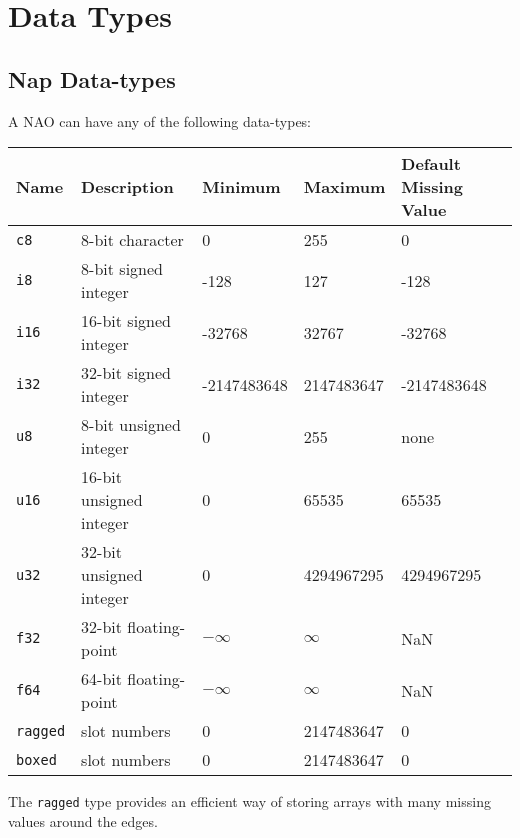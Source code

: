 
\section{Data Types}
    \label{data-type}

\subsection{Nap Data-types}
    \label{data-type-Nap-Data-types}

A NAO can have any of the following data-types:
  
\begin{tabular}{|l|l|l|l|l|}
    \hline 
      \textbf{Name} & \textbf{Description} & \textbf{Minimum} & \textbf{Maximum}
	& \textbf{Default Missing Value}
    \\ \hline 
    \hline 
        \texttt{c8} & 8-bit character & 0 & 255 & 0
    \\ \hline 
        \texttt{i8} & 8-bit signed integer & -128 & 127 & -128
    \\ \hline 
        \texttt{i16} & 16-bit signed integer & -32768 & 32767 & -32768 
    \\ \hline 
        \texttt{i32} & 32-bit signed integer & -2147483648 & 2147483647 & -2147483648 
    \\ \hline 
        \texttt{u8} & 8-bit unsigned integer & 0 & 255 & none
    \\ \hline 
        \texttt{u16} & 16-bit unsigned integer & 0 & 65535 & 65535 
    \\ \hline 
        \texttt{u32} & 32-bit unsigned integer & 0 & 4294967295 & 4294967295 
    \\ \hline 
        \texttt{f32} & 32-bit floating-point & $-\infty$ & $\infty$ & NaN
    \\ \hline 
        \texttt{f64} & 64-bit floating-point & $-\infty$ & $\infty$ & NaN
    \\ \hline 
        \texttt{ragged} & slot numbers & 0 & 2147483647 & 0
    \\ \hline 
        \texttt{boxed} & slot numbers & 0 & 2147483647 & 0
    \\ \hline
\end{tabular}
  

The 
  \texttt{ragged} type provides an efficient way of storing arrays
  with many missing values around the edges.
  

